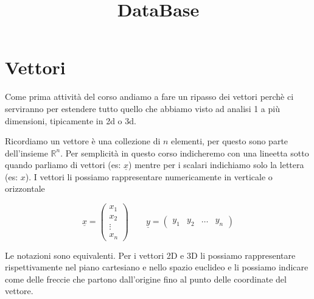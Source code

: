 \documentclass{rapport}
\title{DataBase} %
\begin{document}

\subject{Analisi 1} %


        
\buildmargins %
\buildcover %
\toc %




\section{Vettori}

Come prima attività del corso andiamo a fare un ripasso dei vettori perchè ci serviranno per estendere tutto quello che abbiamo visto ad analisi 1 a più dimensioni, tipicamente in 2d o 3d. 

Ricordiamo un vettore è una collezione di $n$ elementi, per questo sono parte dell'insieme $\mathbb{R}^n$. Per semplicità in questo corso indicheremo con una lineetta sotto quando parliamo di vettori (es: $\underline{x}$) mentre per i scalari indichiamo solo la lettera (es: $x$). I vettori li possiamo rappresentare numericamente in verticale o orizzontale

\[
\underline{x}=\begin{pmatrix} x_1 \\ x_2 \\ \vdots \\ x_n \end{pmatrix} \quad  \quad \underline{y} =  \begin{pmatrix} y_1 & y_2 & \dots & y_n \end{pmatrix}
\]

Le notazioni sono equivalenti. Per i vettori 2D e 3D li possiamo rappresentare rispettivamente nel piano cartesiano e nello spazio euclideo e li possiamo indicare come delle freccie che partono dall'origine fino al punto delle coordinate del vettore.

\vspace{0.2cm}
\end{document}

